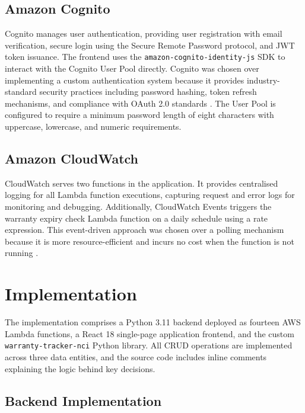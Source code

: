 \documentclass[conference]{IEEEtran}
\begin{document}
\subsection{Amazon Cognito}

Cognito manages user authentication, providing user registration with email verification, secure login using the Secure Remote Password protocol, and JWT token issuance. The frontend uses the \texttt{amazon-cognito-identity-js} SDK to interact with the Cognito User Pool directly. Cognito was chosen over implementing a custom authentication system because it provides industry-standard security practices including password hashing, token refresh mechanisms, and compliance with OAuth 2.0 standards \cite{awscognito2024}. The User Pool is configured to require a minimum password length of eight characters with uppercase, lowercase, and numeric requirements.

\subsection{Amazon CloudWatch}

CloudWatch serves two functions in the application. It provides centralised logging for all Lambda function executions, capturing request and error logs for monitoring and debugging. Additionally, CloudWatch Events triggers the warranty expiry check Lambda function on a daily schedule using a rate expression. This event-driven approach was chosen over a polling mechanism because it is more resource-efficient and incurs no cost when the function is not running \cite{awscloudwatch2024}.

\section{Implementation}

The implementation comprises a Python 3.11 backend deployed as fourteen AWS Lambda functions, a React 18 single-page application frontend, and the custom \texttt{warranty-tracker-nci} Python library. All CRUD operations are implemented across three data entities, and the source code includes inline comments explaining the logic behind key decisions.

\subsection{Backend Implementation}
\end{document}
